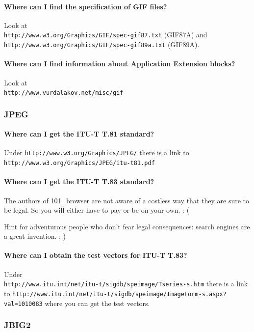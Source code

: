 \documentclass[10pt]{scrbook}
\begin{document}
\paragraph{Where can I find the specification of GIF files?}
Look at \\
\verb|http://www.w3.org/Graphics/GIF/spec-gif87.txt| (GIF87A) and \\
\verb|http://www.w3.org/Graphics/GIF/spec-gif89a.txt| (GIF89A).

\paragraph{Where can I find information about Application Extension blocks?}
Look at \\
\verb|http://www.vurdalakov.net/misc/gif|

\subsubsection{JPEG}

\paragraph{Where can I get the ITU-T T.81 standard?} Under \verb|http://www.w3.org/Graphics/JPEG/| there is a link to \verb|http://www.w3.org/Graphics/JPEG/itu-t81.pdf|

\paragraph{Where can I get the ITU-T T.83 standard?} The authors of 101\_browser are not aware of a costless way that they are sure to be legal. So you will either have to pay or be on your own. :-(

Hint for adventurous people who don't fear legal consequences: search engines are a great invention. ;-)

\paragraph{Where can I obtain the test vectors for ITU-T T.83?} Under \\
\verb|http://www.itu.int/net/itu-t/sigdb/speimage/Tseries-s.htm|
there is a link to
\verb|http://www.itu.int/net/itu-t/sigdb/speimage/ImageForm-s.aspx?val=1010083|
where you can get the test vectors.

\subsubsection{JBIG2}
\end{document}
